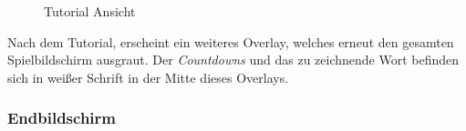 \documentclass[11pt]{article}
\begin{document}
\begin{figure}[ht]
\centering
\caption{\label{fig:tutorial}Tutorial Ansicht}
\end{figure}

Nach dem Tutorial, erscheint ein weiteres Overlay, welches erneut den gesamten Spielbildschirm ausgraut. Der \textit{Countdowns} und das zu zeichnende Wort befinden sich in weißer Schrift in der Mitte dieses Overlays.

\subsubsection{Endbildschirm}
\end{document}
